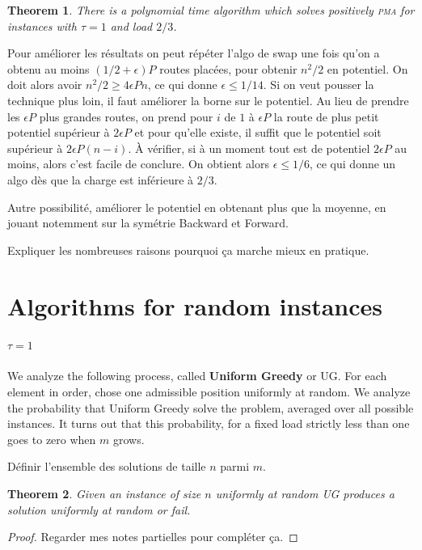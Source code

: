 \documentclass[10pt, conference, letterpaper]{IEEEtran}
\newtheorem{theorem}{Theorem}
\newcommand\pma{\textsc{pma}\xspace}
\begin{document}
\begin{theorem}
There is a polynomial time algorithm which solves positively \pma for instances with $\tau =1$ and load $2/3$. 
\end{theorem}

Pour améliorer les résultats on peut répéter l'algo de swap une fois qu'on a obtenu 
au moins $(1/2 + \epsilon)P$ routes placées, pour obtenir $n^2/2$ en potentiel. 
On doit alors avoir $n^2/2 \geq 4\epsilon P n$, ce qui donne $\epsilon \leq 1/14$.
Si on veut pousser la technique plus loin, il faut améliorer la borne sur le potentiel.
Au lieu de prendre les $\epsilon P$ plus grandes routes, on prend pour $i$ de $1$
à $\epsilon P$ la route de plus petit potentiel supérieur à $2 \epsilon P$ et 
pour qu'elle existe, il suffit que le potentiel soit supérieur à $2\epsilon P (n -i)$.
À vérifier, si à un moment tout est de potentiel $2 \epsilon P$ au moins, alors 
c'est facile de conclure. On obtient alors $\epsilon \leq 1/6$, ce qui donne un algo
dès que la charge est inférieure à $2/3$.

Autre possibilité, améliorer le potentiel en obtenant plus que la moyenne, en jouant notemment sur la symétrie Backward et Forward.

Expliquer les nombreuses raisons pourquoi ça marche mieux en pratique.




\section{Algorithms for random instances}

\paragraph{$\tau = 1$}

We analyze the following process, called \textbf{Uniform Greedy} or UG.
For each element in order, chose one admissible position
uniformly at random. We analyze the probability that Uniform Greedy
solve the problem, averaged over all possible instances. 
It turns out that this probability, for a fixed load strictly less than one goes to zero when $m$ grows. 

Définir l'ensemble des solutions de taille $n$ parmi $m$.
\begin{theorem}
Given an instance of size $n$ uniformly at random UG
produces a solution uniformly at random or fail.
\end{theorem}
\begin{proof}
Regarder mes notes partielles pour compléter ça.
\end{proof}
\end{document}
